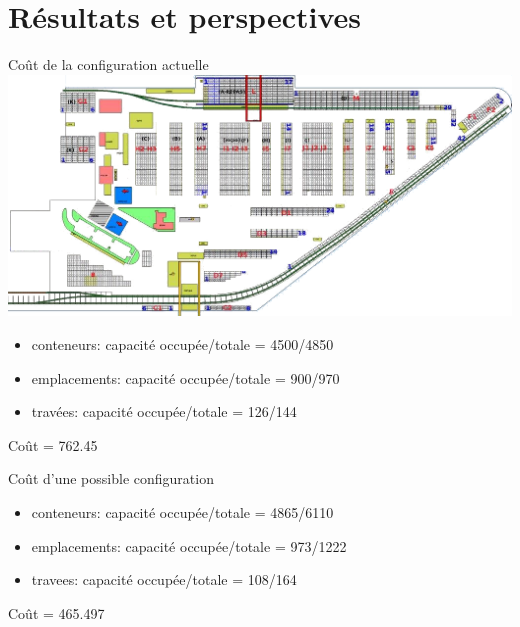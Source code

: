 \section{Résultats et perspectives}

\begin{frame}{Coût de la configuration actuelle}
  \includegraphics[width=\textwidth]{../images/Plan_Terminal.png}
  \vfill
  \begin{itemize}
  \item conteneurs: capacité occupée/totale = 4500/4850
  \item emplacements: capacité occupée/totale = 900/970
  \item travées: capacité occupée/totale = 126/144
  \end{itemize}
  \vfill
  \begin{center}
    Coût = 762.45
  \end{center}
\end{frame}

\begin{frame}{Coût d'une possible configuration}
  
  \vfill
  \begin{itemize}
  \item conteneurs: capacité occupée/totale = 4865/6110
  \item emplacements: capacité occupée/totale = 973/1222
  \item travees: capacité occupée/totale = 108/164
  \end{itemize}
  \vfill
  \begin{center}
    {\color{green!50!black}Coût = 465.497}
  \end{center}
\end{frame}

